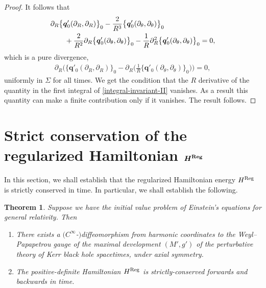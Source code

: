 \documentclass[11pt]{article}
\numberwithin{equation}{section}
\def\ptl{\partial}%
\def\mbo#1{\boldsymbol{#1}}%
\numberwithin{equation}{section}
\newtheorem{Theorem}{Theorem}[section]
\begin{document}
\begin{proof}
It follows that
\begin{align*}
&\ptl_R \bigl\{ \mbo{q}'_0 (\ptl_R, \ptl_R) \bigr\}_0 - \frac{2}{R^3} \bigl\{ \mbo{q}'_0 (\ptl_\theta, \ptl_\theta) \bigr\}_0 \notag\\
& \qquad{} + \frac{2}{R^2} \ptl_R \bigl\{ \mbo{q}'_0 (\ptl_\theta, \ptl_\theta) \bigr\}_0 -
\frac{1}{R} \ptl^2_R \bigl\{ \mbo{q}'_0 (\ptl_\theta, \ptl_\theta) \bigr\}_0 =0,
\end{align*}
which is a pure divergence,
\begin{align*}
\ptl_R \biggl(\bigl\{ \mbo{q}'_0 (\ptl_R, \ptl_R) \bigr\}_0 - \ptl_R \biggl( \frac{1}{R} \bigl\{ \mbo{q}'_0 (\ptl_\theta, \ptl_\theta) \bigr\}_0 \biggr) \biggr) = 0,
\end{align*}
uniformly in $\Sigma$ for all times. We get the condition that the $R$ derivative of the quantity in the first integral of \eqref{integral-invariant-II} vanishes. As a result this quantity can make a finite contribution only if it vanishes. The result follows.
\end{proof}

\section{Strict conservation of the regularized Hamiltonian \texorpdfstring{$\boldsymbol{H^{{\rm Reg}}}$}{H\string^\{Reg\}}}\label{section8}

In this section, we shall establish that the regularized Hamiltonian energy $H^{{\rm Reg}}$ is strictly conserved in time. In particular, we shall establish the following.

\begin{Theorem}
	Suppose we have the initial value problem of Einstein's equations for general relativity. Then
	\begin{enumerate}\itemsep=0pt
		\item[$(1)$] There exists a $(C^\infty$-$)$diffeomorphism from harmonic coordinates to the Weyl--Papapetrou gauge of the maximal development $(M', g')$ of the perturbative theory of Kerr black hole spacetimes, under axial symmetry.
		
		\item[$(2)$] The positive-definite Hamiltonian $H^{{\rm Reg}}$ is strictly-conserved forwards and backwards in time.
	\end{enumerate}
\end{Theorem}
\end{document}
